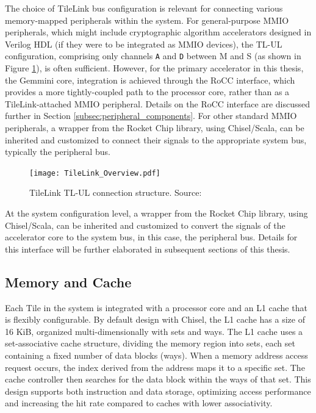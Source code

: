 
The choice of TileLink bus configuration is relevant for connecting various memory-mapped peripherals within the system. For general-purpose MMIO peripherals, which might include cryptographic algorithm accelerators designed in Verilog HDL (if they were to be integrated as MMIO devices), the TL-UL configuration, comprising only channels \texttt{A} and \texttt{D} between M and S (as shown in Figure \ref{fig:tilelink_tl_ul_structure}), is often sufficient. However, for the primary accelerator in this thesis, the Gemmini core, integration is achieved through the RoCC interface, which provides a more tightly-coupled path to the processor core, rather than as a TileLink-attached MMIO peripheral. Details on the RoCC interface are discussed further in Section \ref{subsec:peripheral_components}. For other standard MMIO peripherals, a wrapper from the Rocket Chip library, using Chisel/Scala, can be inherited and customized to connect their signals to the appropriate system bus, typically the peripheral bus.


\begin{figure}[h!]
    \centering
    \texttt{[image: TileLink\_Overview.pdf]} %
    \caption{TileLink TL-UL connection structure. Source: \cite{sifive2018tilelink}}
    \label{fig:tilelink_tl_ul_structure}
\end{figure}

At the system configuration level, a wrapper from the Rocket Chip library, using Chisel/Scala, can be inherited and customized to convert the signals of the accelerator core to the system bus, in this case, the peripheral bus. Details for this interface will be further elaborated in subsequent sections of this thesis.

\subsection{Memory and Cache}
\label{subsec:memory_cache}

Each Tile in the system is integrated with a processor core and an L1 cache that is flexibly configurable. By default design with Chisel, the L1 cache has a size of 16 KiB, organized multi-dimensionally with sets and ways. The L1 cache uses a set-associative cache structure, dividing the memory region into sets, each set containing a fixed number of data blocks (ways). When a memory address access request occurs, the index derived from the address maps it to a specific set. The cache controller then searches for the data block within the ways of that set. This design supports both instruction and data storage, optimizing access performance and increasing the hit rate compared to caches with lower associativity.

